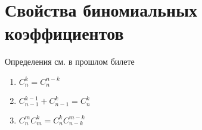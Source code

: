 \documentclass[discrete.tex]{subfiles}
\begin{document}
\section{Свойства биномиальных коэффициентов}
Определения см. в прошлом билете
\begin{enumerate}
  \item $C_n^k = C_n^{n-k}$
  \item $C^{k-1}_{n-1} + C^k_{n-1} = C^k_n$
  \item $C^m_n C^k_m = C^k_n C^{m-k}_{n-k}$
\end{enumerate}
\end{document}
